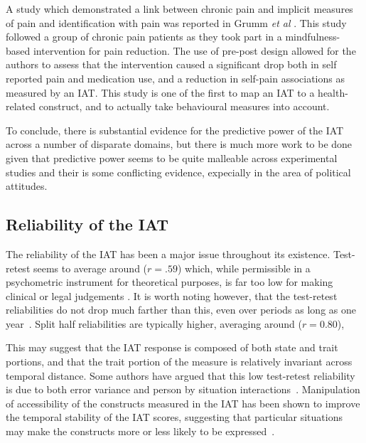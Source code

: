 A study which demonstrated a link between chronic pain and implicit measures of pain and identification with pain was reported in Grumm \textit{et al} \cite{Grumm2008}. This study followed a group of chronic pain patients as they took part in a mindfulness-based intervention for pain reduction. The use of pre-post design allowed for the authors to assess that the intervention caused a significant drop both in self reported pain and medication use, and a reduction in self-pain associations as measured by an IAT. This study is one of the first to map an IAT to a health-related construct, and to actually take behavioural measures into account. 

To conclude, there is substantial evidence for the predictive power of the IAT across a number of disparate domains, but there is much more work to be done given that predictive power seems to be quite malleable across experimental studies and their is some conflicting evidence, expecially in the area of political attitudes. 

\subsection{Reliability of the IAT}
\label{sec:reliability-iat}

The reliability of the IAT has been a major issue throughout its existence. Test-retest seems to average around ($r=.59$) which, while permissible in a psychometric instrument for theoretical purposes, is far too low for making clinical or legal judgements \cite{Greenwald2000, Blanton2006d}. It is worth noting however, that the test-retest reliabilities do not drop much farther than this, even over periods as long as one year~\cite{Egloff2005}. 
Split half reliabilities are typically higher, averaging around ($r=0.80$),  

This may suggest that the IAT response is composed of both state and trait portions, and that the trait portion of the measure is relatively invariant across temporal distance. Some authors have argued that this low test-retest reliability is due to both error variance and person by situation interactions~\cite{Gschwendner2008}.  Manipulation of accessibility of the constructs measured in the IAT has been shown to improve the temporal stability of the IAT scores, suggesting that particular situations may make the constructs more or less likely to be expressed~\cite{Gschwendner2008}. 





